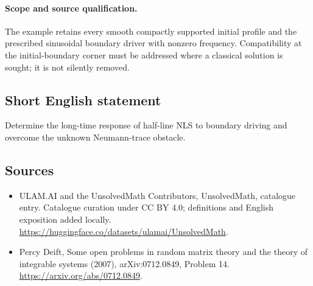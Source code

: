 \documentclass[11pt]{article}
\begin{document}
\paragraph{Scope and source qualification.}The example retains every smooth compactly supported initial profile and the prescribed sinusoidal boundary driver with nonzero frequency. Compatibility at the initial-boundary corner must be addressed where a classical solution is sought; it is not silently removed.
\subsection{Short English statement}
Determine the long-time response of half-line NLS to boundary driving and overcome the unknown Neumann-trace obstacle.
\subsection{Sources}
\begin{itemize}
\item[\hypertarget{source:statement:1}{S1}] ULAM.AI and the UnsolvedMath Contributors, UnsolvedMath, catalogue entry. Catalogue curation under CC BY 4.0; definitions and English exposition added locally.
\url{https://huggingface.co/datasets/ulamai/UnsolvedMath}.
\item[\hypertarget{source:statement:2}{S2}] Percy Deift, Some open problems in random matrix theory and the theory of integrable systems (2007), arXiv:0712.0849, Problem 14.
\url{https://arxiv.org/abs/0712.0849}.
\end{itemize}
\label{end:statement}
\end{document}
